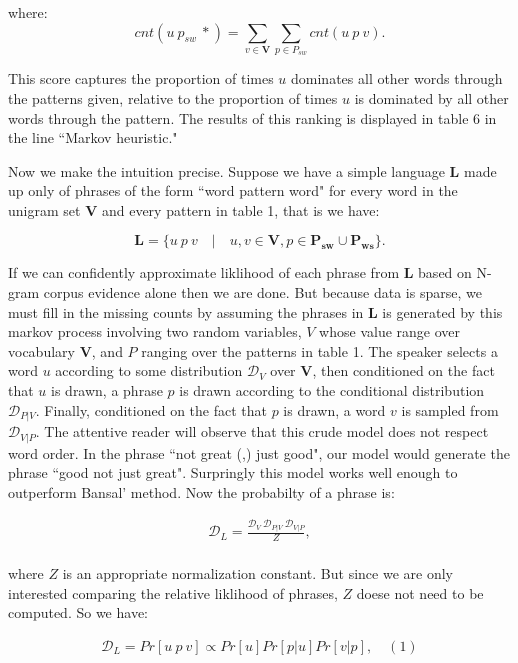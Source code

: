 \documentclass[11pt,letterpaper]{article}
\begin{document}
where:
\[cnt( u \: p_{sw} \: *) = \sum_{v \in \mathbf{V}} \sum_{p \in P_{sw}} cnt( u \: p \: v).\]

This score captures the proportion of times $u$ dominates all other words through the patterns given, relative to the proportion of times $u$ is dominated by all other words through the pattern. The results of this ranking is displayed in table 6 in the line ``Markov heuristic."

Now we make the intuition precise. Suppose we have a simple language $\mathbf{L}$ made up only of phrases of the form ``word pattern word" for every word in the unigram set $\mathbf{V}$ and every pattern in table 1, that is we have:

\[ \mathbf{L} = \{ u \: p \: v \quad|\quad u,v \in \mathbf{V}, p \in \mathbf{P_{sw}} \cup \mathbf{P_{ws}} \}. \]

If we can confidently approximate liklihood of each phrase from $\mathbf{L}$ based on N-gram corpus evidence alone then we are done. But because data is sparse, we must fill in the missing counts by assuming the phrases in $\mathbf{L}$ is generated by this markov process involving two random variables, $V$ whose value range over vocabulary $\mathbf{V}$, and $P$ ranging over the patterns in table 1. The speaker selects a word $u$ according to some distribution $\mathcal{D}_{V}$ over $\mathbf{V}$,  then conditioned on the fact that $u$ is drawn, a phrase $p$ is drawn according to the conditional distribution $\mathcal{D}_{P|V}$. Finally, conditioned on the fact that $p$ is drawn, a word $v$ is sampled from $\mathcal{D}_{V|P}$. The attentive reader will observe that this crude model does not respect word order. In the phrase ``not great (,) just good", our model would generate the phrase ``good not just great". Surpringly this model works well enough to outperform Bansal' method. Now the probabilty of a phrase is:

\begin{align*}
\mathcal{D}_L = \frac{\mathcal{D}_{V} \: \mathcal{D}_{P|V} \: \mathcal{D}_{V|P}}{Z},\\
\end{align*}

where $Z$ is an appropriate normalization constant. But since we are only interested comparing the relative liklihood of phrases, $Z$ doese not need to be computed. So we have:

\begin{align*}
\mathcal{D}_L = Pr[u \: p \: v] \propto Pr[u] Pr[p | u] Pr[v | p], \quad (1)
\end{align*}
\end{document}
